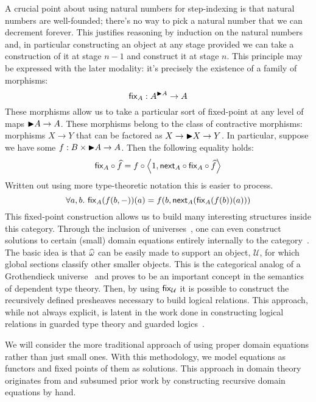 A crucial point about using natural numbers for step-indexing is that
natural numbers are well-founded; there's no way to pick a natural
number that we can decrement forever. This justifies reasoning by
induction on the natural numbers and, in particular
constructing an object at any stage provided we can take a
construction of it at stage $n - 1$ and construct it at stage
$n$. This principle may be expressed with the later modality: it's
precisely the existence of a family of morphisms:
\[
  \mathsf{fix}_A : A^{{\blacktriangleright} A} \to A
\]
These morphisms allow us to take a particular sort of fixed-point at
any level of maps ${\blacktriangleright} A \to A$. These morphisms belong to the
class of contractive morphisms: morphisms $X \to Y$ that can be
factored as $X \to {\blacktriangleright} X \to Y$. In particular, suppose we have
some $f : B \times {\blacktriangleright} A \to A$. Then the following equality holds:
\[
  \mathsf{fix}_A \circ \widehat{f} = f \circ \left\langle 1, \mathsf{next}_A \circ \mathsf{fix}_A \circ \widehat{f} \right\rangle
\]
Written out using more type-theoretic notation this is easier to
process.
\[
  \forall a, b.\ \fix_A(f(b, -))(a) = f (b, \delay_A(\fix_A(f(b))(a)))
\]
This fixed-point construction allows us to build many interesting
structures inside this category. Through the inclusion of
universes~\citep{Hofmann:90s}, one can even construct solutions to
certain (small) domain equations entirely internally to the
category~\citep{Birkedal:13}. The basic idea is that
$\widehat{\omega}$ can be easily made to support an object,
$\mathcal{U}$, for which global sections classify other smaller
objects. This is the categorical analog of a Grothendieck
universe~\citep{Streicher:04} and proves to be an important
concept in the semantics of dependent type theory. Then, by using
$\mathsf{fix}_{\mathcal{U}}$ it is possible to construct the recursively defined
presheaves necessary to build logical relations. This approach, while
not always explicit, is latent in the work done in constructing logical
relations in guarded type theory and guarded
logics~\citep{Dreyer:09,Paviotti:15,Krogh-Jespersen:17}.

We will consider the more traditional approach of using proper domain
equations rather than just small ones. With this methodology, we model
equations as functors and fixed points of them as solutions. This
approach in domain theory originates from \citet{Smyth:77} and
subsumed prior work by \citet{Scott:76} constructing recursive domain
equations by hand.


